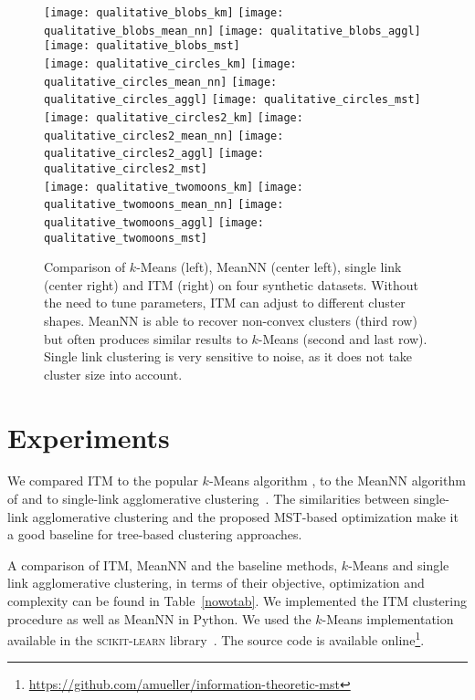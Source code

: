 \begin{figure}[t]
\centering
\texttt{[image: qualitative\_blobs\_km]}
\texttt{[image: qualitative\_blobs\_mean\_nn]}
\texttt{[image: qualitative\_blobs\_aggl]}
\texttt{[image: qualitative\_blobs\_mst]} \\ 

\texttt{[image: qualitative\_circles\_km]}
\texttt{[image: qualitative\_circles\_mean\_nn]}
\texttt{[image: qualitative\_circles\_aggl]}
\texttt{[image: qualitative\_circles\_mst]} \\ 

\texttt{[image: qualitative\_circles2\_km]}
\texttt{[image: qualitative\_circles2\_mean\_nn]}
\texttt{[image: qualitative\_circles2\_aggl]}
\texttt{[image: qualitative\_circles2\_mst]} \\ 

\texttt{[image: qualitative\_twomoons\_km]}
\texttt{[image: qualitative\_twomoons\_mean\_nn]}
\texttt{[image: qualitative\_twomoons\_aggl]}
\texttt{[image: qualitative\_twomoons\_mst]} \\ 
\caption{Comparison of $k$-Means (left), MeanNN (center left), single link
(center right) and ITM (right) on four synthetic datasets.  Without the need to
tune parameters, ITM can adjust to different cluster shapes.  MeanNN is able to
recover non-convex clusters (third row) but often produces similar results to
$k$-Means (second and last row). Single link clustering is very sensitive
to noise, as it does not take cluster size into account.}
\label{fig:qualitative}
\end{figure}

\section{Experiments}
We compared ITM to the popular $k$-Means algorithm 
\citep{macqueen1967some,lloyd1982least}, to the MeanNN algorithm of
\citet{faivishevsky2010nonparametric} and to single-link agglomerative
clustering~\citep{gower1969minimum}. The similarities between single-link
agglomerative clustering and the proposed MST-based optimization make it a 
good baseline for tree-based clustering approaches.

\enlargethispage{5mm}
A comparison of ITM, MeanNN and the baseline methods, $k$-Means and 
single link agglomerative clustering, in terms of their objective, 
optimization and complexity can be found in Table~\ref{nowotab}. 
We implemented the ITM clustering procedure as well as MeanNN in Python.  We
used the $k$-Means implementation available in the \textsc{scikit-learn}
library~\citep{pedregosa2011scikit}. The source
code is available online\footnote{\url{https://github.com/amueller/information-theoretic-mst}}.

